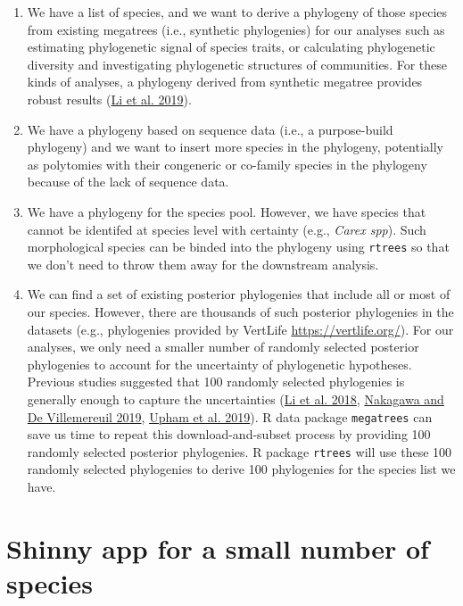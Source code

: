 \documentclass[
  12pt,
]{article}
\providecommand{\tightlist}{%
  \setlength{\itemsep}{0pt}\setlength{\parskip}{0pt}}
\begin{document}
\begin{enumerate}
\def\labelenumi{\arabic{enumi}.}
\tightlist
\item
  We have a list of species, and we want to derive a phylogeny of those species from existing megatrees (i.e., synthetic phylogenies) for our analyses such as estimating phylogenetic signal of species traits, or calculating phylogenetic diversity and investigating phylogenetic structures of communities. For these kinds of analyses, a phylogeny derived from synthetic megatree provides robust results (\protect\hyperlink{ref-li2019common}{Li et al. 2019}).
\item
  We have a phylogeny based on sequence data (i.e., a purpose-build phylogeny) and we want to insert more species in the phylogeny, potentially as polytomies with their congeneric or co-family species in the phylogeny because of the lack of sequence data.
\item
  We have a phylogeny for the species pool. However, we have species that cannot be identifed at species level with certainty (e.g., \emph{Carex spp}). Such morphological species can be binded into the phylogeny using \texttt{rtrees} so that we don't need to throw them away for the downstream analysis.
\item
  We can find a set of existing posterior phylogenies that include all or most of our species. However, there are thousands of such posterior phylogenies in the datasets (e.g., phylogenies provided by VertLife \url{https://vertlife.org/}). For our analyses, we only need a smaller number of randomly selected posterior phylogenies to account for the uncertainty of phylogenetic hypotheses. Previous studies suggested that 100 randomly selected phylogenies is generally enough to capture the uncertainties (\protect\hyperlink{ref-li2018species}{Li et al. 2018}, \protect\hyperlink{ref-nakagawa2019general}{Nakagawa and De Villemereuil 2019}, \protect\hyperlink{ref-upham2019inferring}{Upham et al. 2019}). R data package \texttt{megatrees} can save us time to repeat this download-and-subset process by providing 100 randomly selected posterior phylogenies. R package \texttt{rtrees} will use these 100 randomly selected phylogenies to derive 100 phylogenies for the species list we have.
\end{enumerate}

\hypertarget{shinny-app-for-a-small-number-of-species}{%
\section{Shinny app for a small number of species}\label{shinny-app-for-a-small-number-of-species}}
\end{document}

